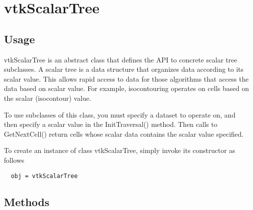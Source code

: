 \section{vtkScalarTree}

\subsection{Usage}

 vtkScalarTree is an abstract class that defines the API to concrete
 scalar tree subclasses. A scalar tree is a data structure that organizes
 data according to its scalar value. This allows rapid access to data for
 those algorithms that access the data based on scalar value. For example,
 isocontouring operates on cells based on the scalar (isocontour) value.

 To use subclasses of this class, you must specify a dataset to operate on,
 and then specify a scalar value in the InitTraversal() method. Then
 calls to GetNextCell() return cells whose scalar data contains the
 scalar value specified.

To create an instance of class vtkScalarTree, simply
invoke its constructor as follows
\begin{verbatim}
  obj = vtkScalarTree
\end{verbatim}
\subsection{Methods}

